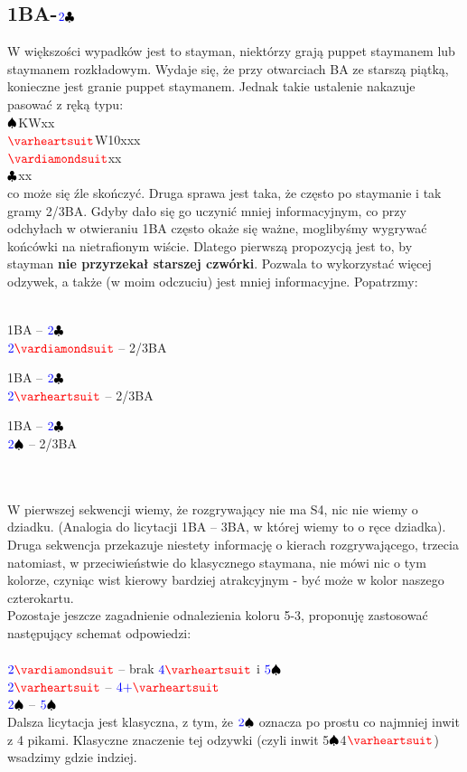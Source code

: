 \documentclass[11pt,a4paper,oneside]{report}
\newcommand*\Hs[1]{\ensuremath{{\color{blue} #1}{\color{red}\varheartsuit}}}
\newcommand*\Ss[1]{\ensuremath{{\color{blue} #1}{\color{black}\spadesuit}}}
\newcommand*\Ds[1]{\ensuremath{{\color{blue} #1}{\color{red}\vardiamondsuit}}}
\newcommand*\Cs[1]{\ensuremath{{\color{blue} #1}{\color{black}\clubsuit}}}
\newcommand{\tab}{\hspace*{15em}}
\newcommand*\Hand[4]{\\\tab\Ss{}#1\\\tab\Hs{}#2\\\tab\Ds{}#3\\\tab\Cs{}#4\\}
\begin{document}
\subsection*{1BA-\Cs{2}}
W większości wypadków jest to stayman, niektórzy grają puppet staymanem lub staymanem
rozkładowym. Wydaje się, że przy otwarciach BA ze starszą piątką, konieczne jest granie
puppet staymanem. Jednak takie ustalenie nakazuje pasować z ręką typu:
\Hand{KWxx}{W10xxx}{xx}{xx}
co może się źle skończyć. Druga sprawa jest taka, że często po staymanie i tak
gramy 2/3BA. Gdyby dało się go uczynić mniej informacyjnym, co przy odchyłach w otwieraniu
1BA często okaże się ważne, moglibyśmy wygrywać końcówki na nietrafionym wiście.
Dlatego pierwszą propozycją jest to, by stayman \textbf{nie przyrzekał starszej czwórki}.
Pozwala to wykorzystać więcej odzywek, a także (w moim odczuciu) jest mniej informacyjne.
Popatrzmy:\\\\
\begin{minipage}[c]{0.30\textwidth}
1BA -- \Cs{2}\\
\Ds{2} -- 2/3BA
\end{minipage}%
\begin{minipage}{0.30\textwidth}
1BA -- \Cs{2}\\
\Hs{2} -- 2/3BA
\end{minipage}%
\begin{minipage}{0.30\textwidth}
1BA -- \Cs{2}\\
\Ss{2} -- 2/3BA
\end{minipage}%
\\\\
W pierwszej sekwencji wiemy, że rozgrywający nie ma S4, nic nie wiemy o dziadku.
(Analogia do licytacji 1BA -- 3BA, w której wiemy to o ręce dziadka). Druga sekwencja
przekazuje niestety informację o kierach rozgrywającego, trzecia natomiast, w przeciwieństwie
do klasycznego staymana, nie mówi nic o tym kolorze, czyniąc wist kierowy bardziej atrakcyjnym -
być może w kolor naszego czterokartu.\\
Pozostaje jeszcze zagadnienie odnalezienia koloru 5-3, proponuję zastosować następujący
schemat odpowiedzi:\\\\
\Ds{2} -- brak \Hs{4} i \Ss{5}\\
\Hs{2} -- \Hs{4+}\\
\Ss{2} -- \Ss{5}\\
Dalsza licytacja jest klasyczna, z tym, że \Ss{2} oznacza po prostu co najmniej
inwit z 4 pikami. Klasyczne znaczenie tej odzywki (czyli inwit 5\Ss{}4\Hs{}) wsadzimy gdzie indziej.
\end{document}
